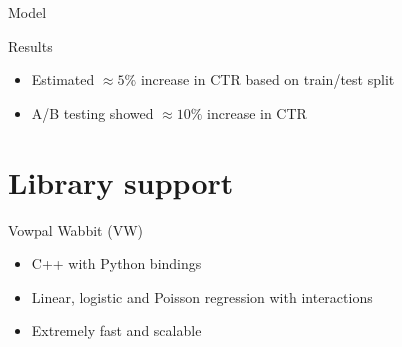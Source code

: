 \documentclass[12pt,aspectratio=169]{beamer}
\begin{document}
\begin{frame}{Model}
\end{frame}

\begin{frame}{Results}
    \begin{itemize}
        \setlength\itemsep{\bigskipamount}
        \item Estimated $\approx 5\%$ increase in CTR based on train/test split
        \item A/B testing showed $\approx 10\%$ increase in CTR
    \end{itemize}
\end{frame}

\section{Library support}

\begin{frame}{Vowpal Wabbit (VW)}
    \begin{itemize}
        \setlength\itemsep{\bigskipamount}
        \item C++ with Python bindings
        \item Linear, logistic and Poisson regression with interactions
        \item Extremely fast and scalable
    \end{itemize}
\end{frame}
\end{document}
